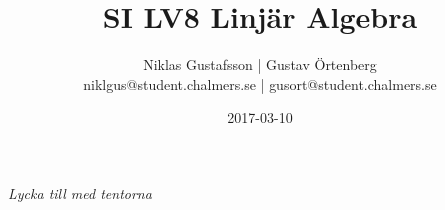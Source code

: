 \documentclass{article}
\title{SI LV8 Linjär Algebra}
\author{Niklas Gustafsson | Gustav Örtenberg  \\ \small{niklgus@student.chalmers.se} | \small{gusort@student.chalmers.se}}
\date{2017-03-10}
\begin{document}
\maketitle
\section{}


\section{}


\section{}

\newpage
\section{}


\section{}


\section{}


\section{}


\newpage
\section{}


\section{}

\section*{}
{\it Lycka till med tentorna}
\end{document}
